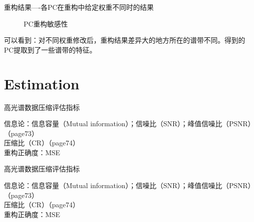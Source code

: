 \documentclass[aspectratio=43]{beamer}
\begin{document}
\begin{frame}{重构结果----各PC在重构中给定权重不同时的结果}
\begin{figure}
  \centering
  \caption{ PC重构敏感性 }
\end{figure}
可以看到：对不同权重修改后，重构结果差异大的地方所在的谱带不同。得到的PC提取到了一些谱带的特征。
\end{frame}

\section{Estimation}
\begin{frame}{高光谱数据压缩评估指标}
\begin{card}
信息论：信息容量（Mutual information）；信噪比（SNR）；峰值信噪比（PSNR）（page73\cite{陈雨时2014}）\\
压缩比（CR）（page74\cite{陈雨时2014}）\\
重构正确度：MSE
\end{card}
\end{frame}

\begin{frame}{高光谱数据压缩评估指标}
\begin{card}
信息论：信息容量（Mutual information）；信噪比（SNR）；峰值信噪比（PSNR）（page73\cite{陈雨时2014}）\\
压缩比（CR）（page74\cite{陈雨时2014}）\\
重构正确度：MSE
\end{card}
\end{frame}
\end{document}
